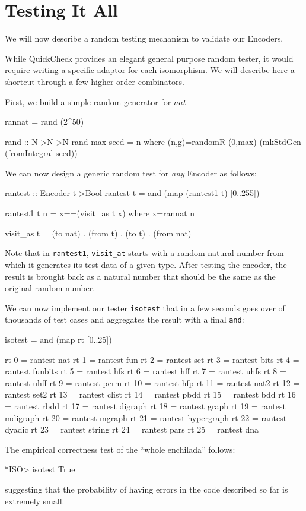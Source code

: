 \documentclass[]{INCLUDES/llncs}
\begin{document}
\section{Testing It All}
We will now describe
a random testing mechanism
to validate our Encoders.

While QuickCheck 
\cite{DBLP:journals/sigplan/ClaessenH02}
provides an elegant general purpose
random tester, it would require
writing a specific adaptor for each isomorphism.
We will describe here a shortcut through
a few higher order combinators.

First, we build a simple random generator for $nat$
\begin{code}
rannat = rand (2^50)

rand :: N->N->N
rand max seed = n where 
  (n,g)=randomR (0,max) (mkStdGen (fromIntegral seed))   
\end{code}

We can now design a generic random test for {\em any}
Encoder as follows:
\begin{code}
rantest :: Encoder t->Bool
rantest t = and (map (rantest1 t) [0..255])

rantest1 t n = x==(visit_as t x) where  x=rannat n

visit_as t = (to nat) . (from t) . (to t) . (from nat) 
\end{code}
Note that in {\tt rantest1}, {\tt visit\_at} starts
with a random natural number from which it generates
its test data of a given type. After testing the encoder,
the result is brought back as a natural number that
should be the same as the original random number.

We can now implement our tester {\tt isotest} that in a few
seconds goes over of thousands of test cases and aggregates the result
with a final {\tt and}:
\begin{code}
isotest = and (map rt [0..25])

rt 0 = rantest nat
rt 1 = rantest fun
rt 2 = rantest set
rt 3 = rantest bits
rt 4 = rantest funbits
rt 5 = rantest hfs
rt 6 = rantest hff
rt 7 = rantest uhfs
rt 8 = rantest uhff
rt 9 = rantest perm
rt 10 = rantest hfp
rt 11 = rantest nat2
rt 12 = rantest set2
rt 13 = rantest clist
rt 14 = rantest pbdd
rt 15 = rantest bdd
rt 16 = rantest rbdd
rt 17 = rantest digraph
rt 18 = rantest graph
rt 19 = rantest mdigraph
rt 20 = rantest mgraph
rt 21 = rantest hypergraph
rt 22 = rantest dyadic
rt 23 = rantest string
rt 24 = rantest pars
rt 25 = rantest dna
\end{code}
The empirical correctness test of the ``whole enchilada'' follows:
\begin{codex}
*ISO> isotest
True
\end{codex}
suggesting that the probability of having errors in
the code described so far is extremely small.
\end{document}
